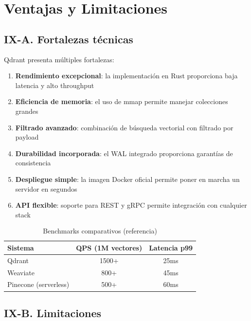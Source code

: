 \documentclass[conference]{IEEEtran}
\begin{document}
\section{Ventajas y Limitaciones}
\label{sec:ventajas}

\subsection{IX-A. Fortalezas técnicas}

Qdrant presenta múltiples fortalezas:

\begin{enumerate}
    \item \textbf{Rendimiento excepcional}: la implementación en Rust proporciona baja latencia y alto throughput
    \item \textbf{Eficiencia de memoria}: el uso de mmap permite manejar colecciones grandes
    \item \textbf{Filtrado avanzado}: combinación de búsqueda vectorial con filtrado por payload
    \item \textbf{Durabilidad incorporada}: el WAL integrado proporciona garantías de consistencia
    \item \textbf{Despliegue simple}: la imagen Docker oficial permite poner en marcha un servidor en segundos
    \item \textbf{API flexible}: soporte para REST y gRPC permite integración con cualquier stack
\end{enumerate}

\begin{table}[htbp]
\caption{Benchmarks comparativos (referencia)}
\label{tab:benchmarks}
\begin{center}
\begin{tabular}{lcc}
\toprule
\textbf{Sistema} & \textbf{QPS (1M vectores)} & \textbf{Latencia p99} \\
\midrule
Qdrant & 1500+ & 25ms \\
Weaviate & 800+ & 45ms \\
Pinecone (serverless) & 500+ & 60ms \\
\bottomrule
\end{tabular}
\end{center}
\end{table}

\subsection{IX-B. Limitaciones}
\end{document}

